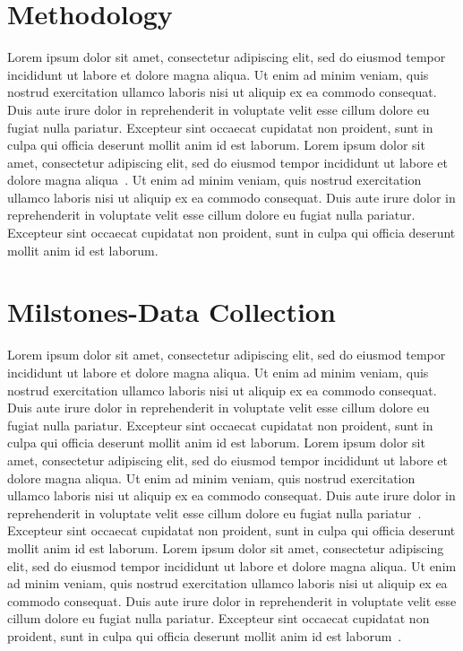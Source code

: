 \documentclass[letterpaper, 10 pt, conference]{ieeeconf}  %
\begin{document}
\section{Methodology}

Lorem ipsum dolor sit amet, consectetur adipiscing elit, sed do eiusmod tempor incididunt ut labore et dolore magna aliqua. Ut enim ad minim veniam, quis nostrud exercitation ullamco laboris nisi ut aliquip ex ea commodo consequat. Duis aute irure dolor in reprehenderit in voluptate velit esse cillum dolore eu fugiat nulla pariatur. Excepteur sint occaecat cupidatat non proident, sunt in culpa qui officia deserunt mollit anim id est laborum. Lorem ipsum dolor sit amet, consectetur adipiscing elit, sed do eiusmod tempor incididunt ut labore et dolore magna aliqua~\cite{PopulationClock202007}. Ut enim ad minim veniam, quis nostrud exercitation ullamco laboris nisi ut aliquip ex ea commodo consequat. Duis aute irure dolor in reprehenderit in voluptate velit esse cillum dolore eu fugiat nulla pariatur. Excepteur sint occaecat cupidatat non proident, sunt in culpa qui officia deserunt mollit anim id est laborum.

\section{Milstones-Data Collection}

Lorem ipsum dolor sit amet, consectetur adipiscing elit, sed do eiusmod tempor incididunt ut labore et dolore magna aliqua. Ut enim ad minim veniam, quis nostrud exercitation ullamco laboris nisi ut aliquip ex ea commodo consequat. Duis aute irure dolor in reprehenderit in voluptate velit esse cillum dolore eu fugiat nulla pariatur. Excepteur sint occaecat cupidatat non proident, sunt in culpa qui officia deserunt mollit anim id est laborum. Lorem ipsum dolor sit amet, consectetur adipiscing elit, sed do eiusmod tempor incididunt ut labore et dolore magna aliqua. Ut enim ad minim veniam, quis nostrud exercitation ullamco laboris nisi ut aliquip ex ea commodo consequat. Duis aute irure dolor in reprehenderit in voluptate velit esse cillum dolore eu fugiat nulla pariatur~\cite{PopulationEnvironment2017}. Excepteur sint occaecat cupidatat non proident, sunt in culpa qui officia deserunt mollit anim id est laborum. Lorem ipsum dolor sit amet, consectetur adipiscing elit, sed do eiusmod tempor incididunt ut labore et dolore magna aliqua. Ut enim ad minim veniam, quis nostrud exercitation ullamco laboris nisi ut aliquip ex ea commodo consequat. Duis aute irure dolor in reprehenderit in voluptate velit esse cillum dolore eu fugiat nulla pariatur. Excepteur sint occaecat cupidatat non proident, sunt in culpa qui officia deserunt mollit anim id est laborum~\cite{Cite6}.
\end{document}
